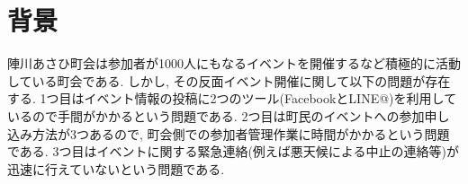 \section{背景}
陣川あさひ町会は参加者が1000人にもなるイベントを開催するなど積極的に活動している町会である.
しかし, その反面イベント開催に関して以下の問題が存在する.
1つ目はイベント情報の投稿に2つのツール(FacebookとLINE@)を利用しているので手間がかかるという問題である.
2つ目は町民のイベントへの参加申し込み方法が3つあるので, 町会側での参加者管理作業に時間がかかるという問題である.
3つ目はイベントに関する緊急連絡(例えば悪天候による中止の連絡等)が迅速に行えていないという問題である.
